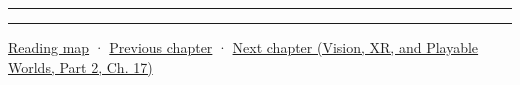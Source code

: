 \begin{center}\rule{0.5\linewidth}{0.5pt}\end{center}

\begin{center}\rule{0.5\linewidth}{0.5pt}\end{center}

\hyperref[volume-reading-map]{Reading map} · \hyperref[06-engine-ii-ch044-cross-backend-conversion-and-agreement]{Previous chapter} · \href{../07-Vision-XR-and-Playable-Worlds-P02/main.pdf\#06-engine-ii-ch046-game-design-from-mechanics-to-narrative-interfaces}{Next chapter (Vision, XR, and Playable Worlds, Part 2, Ch. 17)}
